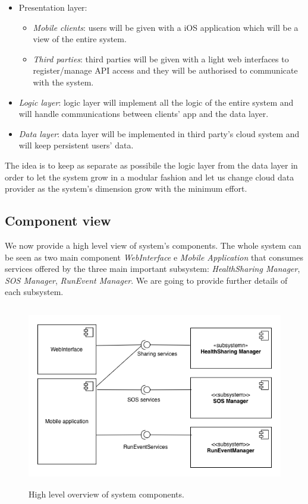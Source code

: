 \documentclass[DD.tex]{subfiles}
\begin{document}
\begin{itemize}
	\item Presentation layer:\begin{itemize}
			\item \textit{Mobile clients}: users will be given with a iOS application which will be a view of the entire system.
			\item \textit{Third parties}: third parties will be given with a light web interfaces to register/manage API access and they will be authorised to communicate with the system.
			\end{itemize}
	\item \textit{Logic layer}: logic layer will implement all the logic of the entire system and will handle communications between clients' app and the data layer.
	\item \textit{Data layer}: data layer will be implemented in third party's cloud system and will keep persistent users' data.
\end{itemize}

The idea is to keep as separate as possibile the logic layer from the data layer in order to let the system grow in a modular fashion and let us change cloud data provider as the system's dimension grow with the minimum effort.
\newpage

\subsection{Component view}
We now provide a high level view of system's components. The whole system can be seen as two main component \textit{WebInterface} e \textit{Mobile Application} that consumes services offered by the three main important subsystem: \textit{HealthSharing Manager}, \textit{SOS Manager}, \textit{RunEvent Manager}. We are going to provide further details of each subsystem.

\begin{figure}[h!]
	\centering
	\includegraphics[height=8.00cm,keepaspectratio]{Figures/ComponentOverview}
	\caption{High level overview of system components.}
\end{figure}
\end{document}
